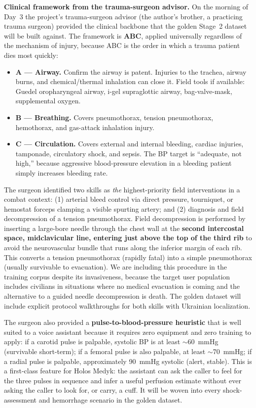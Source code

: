 \documentclass{article}
\theoremstyle{plain}
\theoremstyle{definition}
\theoremstyle{remark}
\begin{document}
\textbf{Clinical framework from the trauma-surgeon advisor.} On the morning of Day~3 the project's trauma-surgeon advisor (the author's brother, a practicing trauma surgeon) provided the clinical backbone that the golden Stage~2 dataset will be built against. The framework is \textbf{ABC}, applied universally regardless of the mechanism of injury, because ABC is the order in which a trauma patient dies most quickly:
\begin{itemize}
\item \textbf{A --- Airway.} Confirm the airway is patent. Injuries to the trachea, airway burns, and chemical/thermal inhalation can close it. Field tools if available: Guedel oropharyngeal airway, i-gel supraglottic airway, bag-valve-mask, supplemental oxygen.
\item \textbf{B --- Breathing.} Covers pneumothorax, tension pneumothorax, hemothorax, and gas-attack inhalation injury.
\item \textbf{C --- Circulation.} Covers external and internal bleeding, cardiac injuries, tamponade, circulatory shock, and sepsis. The BP target is ``adequate, not high,'' because aggressive blood-pressure elevation in a bleeding patient simply increases bleeding rate.
\end{itemize}
The surgeon identified two skills as \emph{the} highest-priority field interventions in a combat context: (1) arterial bleed control via direct pressure, tourniquet, or hemostat forceps clamping a visible spurting artery; and (2) diagnosis and field decompression of a tension pneumothorax. Field decompression is performed by inserting a large-bore needle through the chest wall at the \textbf{second intercostal space, midclavicular line, entering just above the top of the third rib} to avoid the neurovascular bundle that runs along the inferior margin of each rib. This converts a tension pneumothorax (rapidly fatal) into a simple pneumothorax (usually survivable to evacuation). We are including this procedure in the training corpus despite its invasiveness, because the target user population includes civilians in situations where no medical evacuation is coming and the alternative to a guided needle decompression is death. The golden dataset will include explicit protocol walkthroughs for both skills with Ukrainian localization.

The surgeon also provided a \textbf{pulse-to-blood-pressure heuristic} that is well suited to a voice assistant because it requires zero equipment and zero training to apply: if a carotid pulse is palpable, systolic BP is at least $\sim$60~mmHg (survivable short-term); if a femoral pulse is also palpable, at least $\sim$70~mmHg; if a radial pulse is palpable, approximately 90~mmHg systolic (alert, stable). This is a first-class feature for Holos Medyk: the assistant can ask the caller to feel for the three pulses in sequence and infer a useful perfusion estimate without ever asking the caller to look for, or carry, a cuff. It will be woven into every shock-assessment and hemorrhage scenario in the golden dataset.
\end{document}
